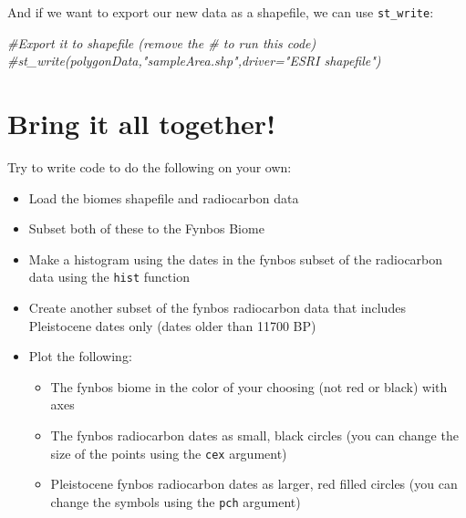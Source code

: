 \documentclass[
]{book}
\newenvironment{Shaded}{\begin{snugshade}}{\end{snugshade}}
\newcommand{\CommentTok}[1]{\textcolor[rgb]{0.56,0.35,0.01}{\textit{#1}}}
\providecommand{\tightlist}{%
  \setlength{\itemsep}{0pt}\setlength{\parskip}{0pt}}
\begin{document}
And if we want to export our new data as a shapefile, we can use \texttt{st\_write}:

\begin{Shaded}
\begin{Highlighting}[]
\CommentTok{\#Export it to shapefile (remove the \# to run this code)}
\CommentTok{\#st\_write(polygonData,"sampleArea.shp",driver="ESRI shapefile")}
\end{Highlighting}
\end{Shaded}

\hypertarget{bring-it-all-together}{%
\chapter{Bring it all together!}\label{bring-it-all-together}}

Try to write code to do the following on your own:

\begin{itemize}
\tightlist
\item
  Load the biomes shapefile and radiocarbon data
\item
  Subset both of these to the Fynbos Biome
\item
  Make a histogram using the dates in the fynbos subset of the radiocarbon data using the \texttt{hist} function
\item
  Create another subset of the fynbos radiocarbon data that includes Pleistocene dates only (dates older than 11700 BP)
\item
  Plot the following:

  \begin{itemize}
  \tightlist
  \item
    The fynbos biome in the color of your choosing (not red or black) with axes
  \item
    The fynbos radiocarbon dates as small, black circles (you can change the size of the points using the \texttt{cex} argument)
  \item
    Pleistocene fynbos radiocarbon dates as larger, red filled circles (you can change the symbols using the \texttt{pch} argument)
  \end{itemize}
\end{itemize}

  
\end{document}
